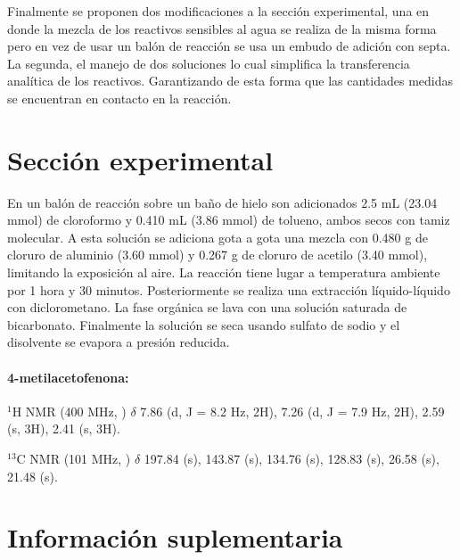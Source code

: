 \documentclass[fleqn,11pt]{SelfArx}
\begin{document}
Finalmente se proponen dos modificaciones a la sección experimental, una en donde la mezcla de los reactivos sensibles al agua se realiza de la misma forma pero en vez de usar un balón de reacción se usa un embudo de adición con septa. La segunda, el manejo de dos soluciones lo cual simplifica la transferencia analítica de los reactivos. Garantizando de esta forma que las cantidades medidas se encuentran en contacto en la reacción.
\pagebreak

\section{Secci\'on experimental}
En un balón de reacción sobre un baño de hielo son adicionados 2.5 mL (23.04 mmol) de cloroformo y 0.410 mL (3.86 mmol) de tolueno, ambos secos con tamiz molecular. A esta solución se adiciona gota a gota una mezcla con 0.480 g de cloruro de aluminio (3.60 mmol) y 0.267 g de cloruro de acetilo (3.40 mmol), limitando la exposición al aire. La reacción tiene lugar a temperatura ambiente por 1 hora y 30 minutos. Posteriormente se realiza una extracción líquido-líquido con diclorometano. La fase orgánica se lava con una solución saturada de bicarbonato. Finalmente la solución se seca usando sulfato de sodio y el disolvente se evapora a presión reducida.

\paragraph{4-metilacetofenona:}
$^1$H NMR (400 MHz, ) $\delta$ 7.86 (d, J = 8.2 Hz, 2H), 7.26 (d, J = 7.9 Hz, 2H), 2.59 (s, 3H), 2.41 (s, 3H).

$^{13}$C NMR (101 MHz, ) $\delta$ 197.84 (s), 143.87 (s), 134.76 (s), 128.83 (s), 26.58 (s), 21.48 (s).

{}



\onecolumn
\section{Informaci\'on suplementaria}\label{sec: complementaria}
\end{document}
